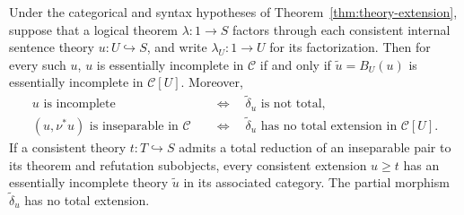 \begin{theorem}
\label{thm:associated-incompleteness}
Under the categorical and syntax hypotheses of
Theorem~\ref{thm:theory-extension}, suppose that a logical theorem $\lambda:1\to S$ factors through each
consistent internal sentence theory $u:U\hookrightarrow S$, and write
$\lambda_U:1\to U$ for its factorization. Then for every such $u$,
$u$ is essentially incomplete in $\mathscr C$ if and only if $\widetilde u=B_U(u)$ is
essentially incomplete in $\mathscr C[U]$. Moreover,
\[
\begin{aligned}
 u\text{ is incomplete}
 &\quad\Longleftrightarrow\quad
 \widetilde\delta_u\text{ is not total},\\
 (u,\nu^*u)\text{ is inseparable in }\mathscr C
 &\quad\Longleftrightarrow\quad
 \widetilde\delta_u\text{ has no total extension in }\mathscr C[U].
\end{aligned}
\]
If a consistent theory $t:T\hookrightarrow S$ admits a total reduction
of an inseparable pair to its theorem and refutation subobjects, every
consistent extension $u\geq t$ has an essentially incomplete theory
$\widetilde u$ in its associated category. The partial morphism $\widetilde\delta_u$ has no total extension.
\end{theorem}
